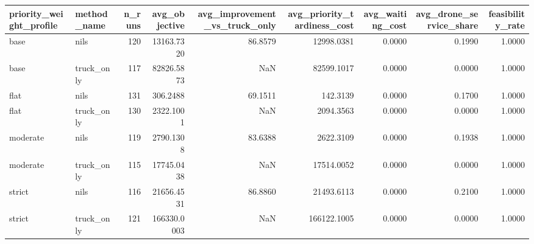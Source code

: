 \begin{tabular}{llrrrrrrr}
\toprule
priority_weight_profile & method_name & n_runs & avg_objective & avg_improvement_vs_truck_only & avg_priority_tardiness_cost & avg_waiting_cost & avg_drone_service_share & feasibility_rate \\
\midrule
base & nils & 120 & 13163.7320 & 86.8579 & 12998.0381 & 0.0000 & 0.1990 & 1.0000 \\
base & truck_only & 117 & 82826.5873 & NaN & 82599.1017 & 0.0000 & 0.0000 & 1.0000 \\
flat & nils & 131 & 306.2488 & 69.1511 & 142.3139 & 0.0000 & 0.1700 & 1.0000 \\
flat & truck_only & 130 & 2322.1001 & NaN & 2094.3563 & 0.0000 & 0.0000 & 1.0000 \\
moderate & nils & 119 & 2790.1308 & 83.6388 & 2622.3109 & 0.0000 & 0.1938 & 1.0000 \\
moderate & truck_only & 115 & 17745.0438 & NaN & 17514.0052 & 0.0000 & 0.0000 & 1.0000 \\
strict & nils & 116 & 21656.4531 & 86.8860 & 21493.6113 & 0.0000 & 0.2100 & 1.0000 \\
strict & truck_only & 121 & 166330.0003 & NaN & 166122.1005 & 0.0000 & 0.0000 & 1.0000 \\
\bottomrule
\end{tabular}
